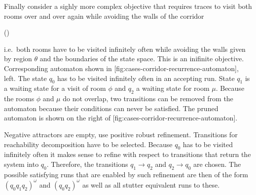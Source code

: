 \startsubsection[title={2-Recurrence and Safety},reference=sec:cases-corridor-recurrence]


    Finally consider a sighly more complex objective that requires traces to visit both rooms over and over again while avoiding the walls of the corridor

    \startformula
        \Globally (\neg \theta \wedge \Finally \phi \wedge \Finally \mu )
    \stopformula

    i.e.\ both rooms have to be visited infinitely often while avoiding the walls given by region $\theta$ and the boundaries of the state space.
    This is an inifinite objective.
    Corresponding automaton shown in [fig:cases-corridor-recurrence-automaton], left.
    The state $q_0$ has to be visited infinitely often in an accepting run.
    State $q_1$ is a waiting state for a visit of room $\phi$ and $q_2$ a waiting state for room $\mu$.
    Because the rooms $\phi$ and $\mu$ do not overlap, two transitions can be removed from the automaton because their conditions can never be satisfied.
    The pruned automaton is shown on the right of [fig:cases-corridor-recurrence-automaton].

    Negative attractors are empty, use positive robust refinement.
    Transitions for reachability decomposition have to be selected.
    Because $q_0$ has to be visited infinitely often it makes sense to refine with respect to transitions that return the system into $q_0$.
    Therefore, the transitions $q_1 \rightarrow q_2$ and $q_2 \rightarrow q_0$ are chosen.
    The possible satisfying runs that are enabled by such refinement are then of the form $(q_0 q_1 q_2)^\omega$ and $(q_0 q_2)^\omega$ as well as all stutter equivalent runs to these.


